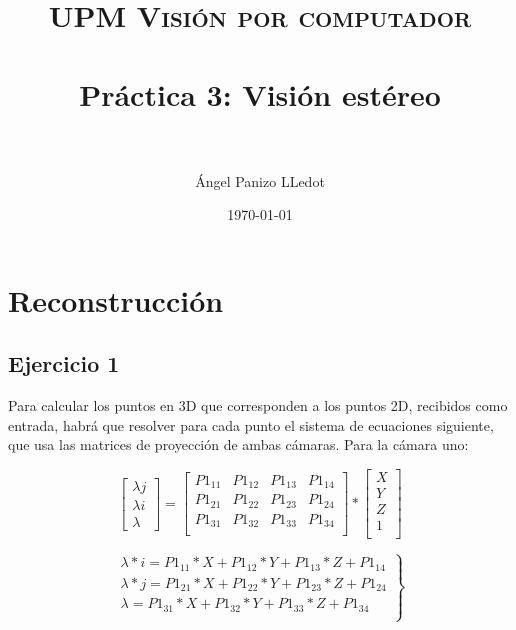 \documentclass[paper=a4, fontsize=11pt]{scrartcl} %
\title{	
\normalfont \normalsize 
\textsc{UPM Visión por computador} \\ [25pt] %
\horrule{0.5pt} \\[0.4cm] %
\huge Práctica 3: Visión estéreo  \\ %
\horrule{2pt} \\[0.5cm] %
}
\author{Ángel Panizo LLedot} %
\date{\normalsize\today} %
\numberwithin{equation}{section} %
\numberwithin{figure}{section} %
\numberwithin{table}{section} %
\begin{document}
\maketitle %

\lstset{language=Python} 

\section{Reconstrucción}
\subsection{Ejercicio 1}

Para calcular los puntos en 3D que corresponden a los puntos 2D, recibidos como entrada, habrá que resolver para cada punto el sistema de ecuaciones siguiente, que usa las matrices de proyección de ambas cámaras. Para la cámara uno:

\begin{equation}
\begin{bmatrix}
 	\lambda j\\
 	\lambda i\\
	\lambda
\end{bmatrix}
=
\begin{bmatrix}
	P1_{11}& P1_{12}& P1_{13}& P1_{14}\\
	P1_{21}& P1_{22}& P1_{23}& P1_{24}\\
	P1_{31}& P1_{32}& P1_{33}& P1_{34}\\
\end{bmatrix}
*
\begin{bmatrix}
 	X\\
 	Y\\
 	Z\\
 	1\\
\end{bmatrix}
\end{equation} 

\begin{equation}
	\left.
	\begin{array}{l}
		\lambda*i = P1_{11}*X + P1_{12}*Y + P1_{13}*Z + P1_{14} \\
		\lambda*j = P1_{21}*X + P1_{22}*Y + P1_{23}*Z + P1_{24} \\
		\lambda = P1_{31}*X + P1_{32}*Y + P1_{33}*Z + P1_{34} \\		
	\end{array}
	\right\rbrace
\end{equation} 
\end{document}

